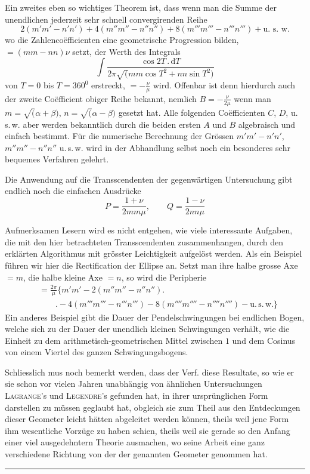 Ein zweites eben so wichtiges Theorem ist, dass wenn man die Summe der
unendlichen jederzeit sehr schnell convergirenden Reihe
\[
2(m'm'-n'n')+4(m''m''-n''n'')+8(m'''m'''-n'''n''')+\mbox{u. s. w.}
\]
wo die Zahlencoëfficienten eine geometrische Progression bilden, $=(mm-nn)\nu$
setzt, der Werth des Integrals
\[
\int\frac{\cos2T\,.\,\mathrm{d}T}
{2\pi\surd(mm\cos T^{2}+nn\sin T^{2})}
\]
von $T=0$ bis $T=360^{0}$ erstreckt, $=-\frac{\nu}{\mu}$ wird. Offenbar ist denn hierdurch auch der zweite Coëfficient obiger Reihe bekannt, nemlich $B=-\frac{\nu}{2\mu}$
wenn man $m=\surd(\alpha+\beta)$, $n=\surd(\alpha-\beta)$ gesetzt hat. Alle folgenden Coëfficienten $C$, $D$, u.\,s.\,w. aber werden bekanntlich durch die beiden ersten $A$ und $B$
algebraisch und einfach bestimmt. Für die numerische Berechnung der Grössen
$m'm'-n'n'$, $m''m''-n''n''$ u.\,s.\,w. wird in der Abhandlung selbst noch ein besonderes
sehr bequemes Verfahren gelehrt.
\par
Die Anwendung auf die Transscendenten der gegenwärtigen Untersuchung
gibt endlich noch die einfachen Ausdrücke
\[
P=\frac{1+\nu}{2mm\mu},\qquad Q=\frac{1-\nu}{2nn\mu}
\]
\par Aufmerksamen Lesern wird es nicht entgehen, wie viele interessante Aufgaben, die mit den hier betrachteten Transscendenten zusammenhangen, durch
den erklärten Algorithmus mit grösster Leichtigkeit aufgelöst werden. Als ein
Beispiel führen wir hier die Rectification der Ellipse an. Setzt man ihre halbe
grosse Axe $=m$, die halbe kleine Axe $=n$, so wird die Peripherie
\[
\begin{aligned}&=\frac{2\pi}{\mu}\bigl\{m'm'-2(m''m''-n''n'')\bigr.\\[5pt]&\qquad\bigl.-4(m'''m'''-n'''n''')-8(m''''m''''-n''''n'''')-\mathrm{u.\,s.\,w.}\bigr\}\end{aligned}
\]
Ein anderes Beispiel gibt die Dauer der Pendelschwingungen bei endlichen Bogen, welche sich zu der Dauer der unendlich kleinen Schwingungen verhält, wie
die Einheit zu dem arithmetisch-geometrischen Mittel zwischen $1$ und dem Cosinus von einem Viertel des ganzen Schwingungsbogens.
\par
Schliesslich mus noch bemerkt werden, dass der Verf. diese Resultate, so
wie er sie schon vor vielen Jahren unabhängig von ähnlichen Untersuchungen
\textsc{Lagrange}'s und \textsc{Legendre}'s gefunden hat, in ihrer ursprünglichen Form darstellen
zu müssen geglaubt hat, obgleich sie zum Theil aus den Entdeckungen dieser Geometer leicht hätten abgeleitet werden können, theils weil jene Form ihm wesentliche Vorzüge zu haben schien, theils weil sie gerade so den Anfang einer viel
ausgedehntern Theorie ausmachen, wo seine Arbeit eine ganz verschiedene Richtung von der der genannten Geometer genommen hat.
\begin{center}\rule{0.25\linewidth}{0.4pt}\end{center}
